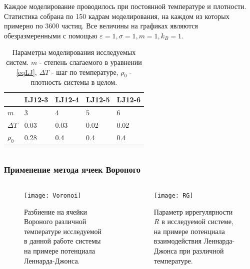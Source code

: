 \documentclass[pdf,hyperref={unicode}]{beamer}
\begin{document}
\begin{frame}
\begin{columns}
\begin{column}{0.5\linewidth}
{Каждое моделирование проводилось при постоянной температуре и плотности. Статистика собрана по 150 кадрам моделирования, на каждом из которых примерно по 3600 частиц. Все величины на графиках являются обезразмеренными с помощью $\varepsilon = 1, \sigma = 1, m = 1, k_B = 1$.

\begin{table}[H]
\begin{center}
\begin{tabular}{| l | l | l | l | l |}
\hline
    & LJ12-3 & LJ12-4 & LJ12-5 & LJ12-6 \\ \hline
$m$   &    3    &     4   &    5    &    6    \\ \hline
$\Delta T$ & 0.03 & 0.03 & 0.02 & 0.02 \\ \hline
$\rho_0$ & 0.28  &  0.4  &  0.4  &  0.4  \\ \hline
\end{tabular}
\end{center}
\caption{\tiny Параметры моделирования исследуемых систем. $m$ - степень слагаемого в уравнении \ref{eqLJ}, $\Delta T$ - шаг по температуре,  $\rho_0$ - плотность системы в целом.}
\label{tablParam}
\end{table}

}
\end{column}

\end{columns}
\end{frame}





\begin{frame}
\transdissolve[duration=0.2]
\frametitle{Применение метода ячеек Вороного}
\begin{columns}


\begin{column}{0.54\linewidth}
{
\begin{figure}[h]
\begin{center}
\texttt{[image: Voronoi]}
\caption{\tiny Разбиение на ячейки Вороного различной температуре исследуемой в данной работе системы на примере потенциала Леннарда-Джонса.}
\label{risvoronoiExp}
\end{center}
\end{figure}
}
\end{column}

\begin{column}{0.6\linewidth}
{
\begin{figure}[h]
\begin{center}
\texttt{[image: RG]}
\caption{\tiny Параметр иррегулярности $R$ в исследуемой системе, на примере потенциала взаимодействия Леннарда-Джонса при различной температуре.}
\label{risIregExp}
\end{center}
\end{figure}
}
\end{column}

\end{columns}
\end{frame}
\end{document}
